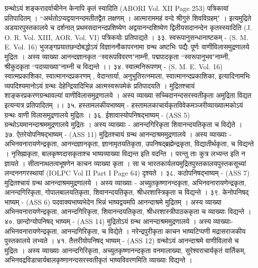 ग्रन्थोऽयं शङ्करादर्वाचीनेन केनापि कृतं स्यादिति (ABORI Vol. XII Page 253) पत्रिकायां प्रतिपादितम् । ``अर्थतोऽप्यद्वयानन्दमतीतद्वैत लक्षणम् । आत्माराममहं वन्दे श्रीगुरुं शिवविग्रहम्" । इत्यमुद्रिते अडयारपुस्तकालये च दर्शनात् प्रथमसदानन्दप्रशिष्येण अद्वयानन्दशिष्येण द्वितीयसदानन्देन कृतस्स्यादिति (J. O. R. Vol. XIII, AOR. Vol. VI) पत्रिकयोः प्रतिपाद्यते ।
३३. स्वरूपानुसन्धानाष्टकम् - (S. M. E. Vol. 16)
भुजङ्गप्रयातछन्दोबद्धोऽयं विज्ञाननौकापरनामा ग्रन्थ अष्टभिः पद्यैः पूर्णः वाणीविलासमुद्रणालये मुद्रितः । अस्य व्याख्या आनन्दज्ञानकृत ``स्वरूपविवरण"नाम्नी, पद्मपादकृता ``स्वरूपानुभव"नाम्नी, श्रीकुदकृता ``पदव्याख्या"नाम्नी च विद्यन्ते ।।
३४. स्वात्मनिरूपणम् - (S. M. E. Vol. 16)
स्वात्मप्रकाशिका, स्वात्मानन्दप्रकरणम् , वेदान्तार्या, अनुभूतिरत्नमाला, स्वात्मानन्दप्रकाशिका, इत्यादिनामभिः व्यपदिश्यमानोऽयं ग्रन्थः देहेन्द्रियादिभिन्न आत्मस्वरूपमेकं प्रतिपादयति । मुद्रितश्चायं शाङ्करप्रकरणग्रन्थावल्यां वाणीविलासमुद्रणालये । अस्य व्याख्या सच्चिदानन्दसरस्वतीकृता अमुद्रिता विद्यत इत्यन्यत्र प्रतिपादितम् ।।
३५. हस्तामलकीयभाष्यम् -
हस्तामलकाचार्यकृतविवेकमञ्जरीव्याख्यात्मकोऽयं ग्रन्थः वाणी विलासमुद्रणालये मुद्रितः ।
३६. ईशावास्योपनिषद्भाष्यम् - (ASS 5)
ग्रन्थोऽयमानन्दाश्रममुद्रणालये मुद्रितः । अस्य व्याख्याः - आनन्दगिरिकृता शिवानन्दयतिकृता च विद्येते ।
३७. ऐतरेयोपनिषद्भाष्यम् - (ASS 11)
मुद्रितश्चायं ग्रन्थ आनन्दाश्रममुद्रणालये । अस्य व्याख्याः - अभिनवनारायणेन्द्रकृता, आनन्दज्ञानकृता, ज्ञानामृतयतिकृता, उपनिषद्ब्रह्मेन्द्रकृता, विद्यातीर्थकृता, च विद्यन्ते । नृसिह्मकृता, बालकृष्णदासकृताश्च भाष्यव्याख्या विद्यन्त इति वदन्ति । परन्तु ताः कुत्र लभ्यन्त इति न ज्ञायते । सीतानाथतत्वभूषणेन काचन व्याख्या कृता । सा च भारतकार्यलयमुद्रितपुस्तकालयपुस्तकसूच्यां लन्दननगरस्थायां (IOLPC Vol II Part I Page 64) दृश्यते ।
३८. कठोपनिषद्भाष्यम् - (ASS 7)
मुद्रितश्चायं ग्रन्थ आनन्दाश्रममुद्रणालये । अस्य व्याख्याः - अच्युतकृष्णानन्दकृता, अभिनवनारायणेन्द्रकृता, आनन्दगिरिकृता, गोपालबालयतिकृता, शिवानन्दयतिकृत, श्रीधरशास्त्रिकृता च विद्यन्ते ।
३९. केनोपनिषद् भाष्यम् - (ASS 6)
पदवाक्यभाष्यभेदेन भिन्नं भाष्यद्वयमपि आनन्दाश्रमे मुद्रितम् । अस्य व्याख्या अभिनवनारायणेन्द्रकृता, आनन्दगिरिकृता, शिवानन्दयतिकृता, श्रीधरशास्त्रीपाठककृता च व्याख्याः विद्यन्ते ।
४०. छान्दोग्योपनिषद् भाष्यम् - (ASS 14)
मुद्रितोऽयं ग्रन्थ आनन्दाश्रममुद्रणालये । अस्य व्याख्याः-अभिनवनारायणेन्द्रकृता, आनन्दगिरिकृता, च विद्येते । नरेन्द्रपुरीकृता काचन भाष्यटिप्पणी मद्रासराजकीय पुस्तकालये लभ्यते ।
४१. तैत्तरीयोपनिषद् भाष्यम् - (ASS 12)
ग्रन्थोऽयं आनन्दाश्रमे वाणीविलासे च मुद्रितः । अस्य व्याख्याः आनन्दगिरिकृता, अच्युतकृष्णानन्दकृता वनमालाख्या, सुरेश्वराचार्यकृतं वार्तिकम्, अभिनवद्रविडाचार्यबालकृष्णानन्दसरस्वतीकृतं भाष्यविवरणमिति व्याख्याः विद्यन्ते ।
